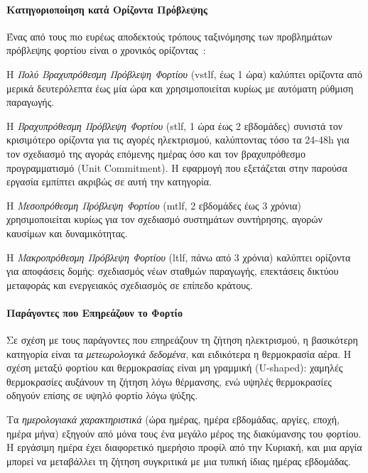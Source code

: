 \paragraph{Κατηγοριοποίηση κατά Ορίζοντα Πρόβλεψης}

Ένας από τους πιο ευρέως αποδεκτούς τρόπους ταξινόμησης των προβλημάτων πρόβλεψης
φορτίου είναι ο χρονικός ορίζοντας~\cite{hong2016}:

Η \textit{Πολύ Βραχυπρόθεσμη Πρόβλεψη Φορτίου} (\gls{vstlf}, έως 1 ώρα) καλύπτει
ορίζοντα από μερικά δευτερόλεπτα έως μία ώρα και χρησιμοποιείται κυρίως με αυτόματη
ρύθμιση παραγωγής.

Η \textit{Βραχυπρόθεσμη Πρόβλεψη Φορτίου} (\gls{stlf}, 1 ώρα έως 2 εβδομάδες)
συνιστά τον κρισιμότερο ορίζοντα για τις αγορές ηλεκτρισμού, καλύπτοντας τόσο
τα 24-48h για τον σχεδιασμό της αγοράς επόμενης ημέρας όσο και τον βραχυπρόθεσμο
προγραμματισμό (Unit Commitment). Η εφαρμογή που εξετάζεται στην παρούσα εργασία
εμπίπτει ακριβώς σε αυτή την κατηγορία.

Η \textit{Μεσοπρόθεσμη Πρόβλεψη Φορτίου} (\gls{mtlf}, 2 εβδομάδες έως 3 χρόνια)
χρησιμοποιείται κυρίως για τον σχεδιασμό συστημάτων συντήρησης, αγορών καυσίμων και δυναμικότητας.

Η \textit{Μακροπρόθεσμη Πρόβλεψη Φορτίου} (\gls{ltlf}, πάνω από 3 χρόνια)
καλύπτει ορίζοντα για αποφάσεις δομής: σχεδιασμός νέων σταθμών παραγωγής,
επεκτάσεις δικτύου μεταφοράς και ενεργειακός σχεδιασμός σε επίπεδο κράτους.

\paragraph{Παράγοντες που Επηρεάζουν το Φορτίο}

Σε σχέση με τους παράγοντες που επηρεάζουν τη ζήτηση ηλεκτρισμού, η βασικότερη
κατηγορία είναι τα \textit{μετεωρολογικά δεδομένα}, και ειδικότερα η θερμοκρασία
αέρα. Η σχέση μεταξύ φορτίου και θερμοκρασίας είναι μη γραμμική (U-shaped): χαμηλές
θερμοκρασίες αυξάνουν τη ζήτηση λόγω θέρμανσης, ενώ υψηλές θερμοκρασίες οδηγούν
επίσης σε υψηλό φορτίο λόγω ψύξης.

Τα \textit{ημερολογιακά χαρακτηριστικά} (ώρα ημέρας, ημέρα εβδομάδας, αργίες, εποχή,
ημέρα μήνα) εξηγούν από μόνα τους ένα μεγάλο μέρος της διακύμανσης του φορτίου.
Η εργάσιμη ημέρα έχει διαφορετικό ημερήσιο προφίλ από την Κυριακή, και μια
αργία μπορεί να μεταβάλλει τη ζήτηση συγκριτικά με μια τυπική ίδιας ημέρας
εβδομάδας.


